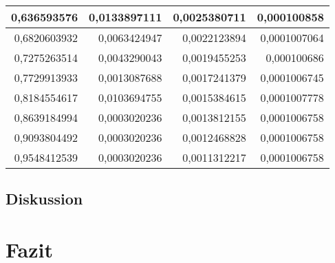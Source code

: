 \documentclass[12pt]{scrartcl}
\begin{document}
\begin{table}[htbp]
\begin{center}
\begin{tabular}{|r|r|r|r|}
0,636593576 & 0,0133897111 & 0,0025380711 & 0,000100858 \\ \hline
0,6820603932 & 0,0063424947 & 0,0022123894 & 0,0001007064 \\ \hline
0,7275263514 & 0,0043290043 & 0,0019455253 & 0,000100686 \\ \hline
0,7729913933 & 0,0013087688 & 0,0017241379 & 0,0001006745 \\ \hline
0,8184554617 & 0,0103694755 & 0,0015384615 & 0,0001007778 \\ \hline
0,8639184994 & 0,0003020236 & 0,0013812155 & 0,0001006758 \\ \hline
0,9093804492 & 0,0003020236 & 0,0012468828 & 0,0001006758 \\ \hline
0,9548412539 & 0,0003020236 & 0,0011312217 & 0,0001006758 \\ \hline
\end{tabular}
\end{center}
\label{tab:a_4_e}
\end{table}


\subsection{Diskussion}


\section{Fazit}


\end{document}
